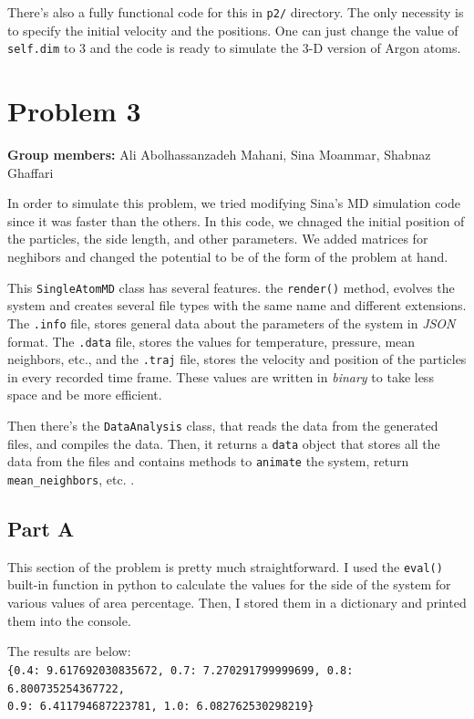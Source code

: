 \documentclass[12pt, a4paper]{article}
\begin{document}
	There's also a fully functional code for this in \texttt{p2/} directory. The only necessity is to specify the initial velocity and the positions. One can 
	just change the value of \texttt{self.dim} to $3$ and the code is ready to simulate the 3-D version of Argon atoms.

	\section{Problem 3}
	\textbf{Group members:} Ali Abolhassanzadeh Mahani, Sina Moammar, Shabnaz Ghaffari
	
	In order to simulate this problem, we tried modifying Sina's MD simulation code since it was faster than the others. In this code, we chnaged the 
	initial position of the particles, the side length, and other parameters. We added matrices for neghibors and changed the potential to be of 
	the form of the problem at hand. 
	
	This \texttt{SingleAtomMD} class has several features. the \texttt{render()} method, evolves the system and creates several file types with the
	same name and different extensions. The \texttt{.info} file, stores general data about the parameters of the system in \emph{JSON} format.
	The \texttt{.data} file, stores the values for temperature, pressure, mean neighbors, etc., and the \texttt{.traj} file, stores the velocity and
	position of the particles in every recorded time frame. These values are written in \emph{binary} to take less space and be more efficient.
	
	Then there's the \texttt{DataAnalysis} class, that reads the data from the generated files, and compiles the data. Then, it returns a \texttt{data}
	object that stores all the data from the files and contains methods to \texttt{animate} the system, return \texttt{mean\_neighbors}, etc. .
	
	\subsection{Part A}
	This section of the problem is pretty much straightforward. I used the \texttt{eval()} built-in function in python to calculate the values for 
	the side of the system for various values of area percentage. Then, I stored them in a dictionary and printed them into the console.
		
	The results are below:\\
	\texttt{\{0.4: 9.617692030835672, 0.7: 7.270291799999699, 0.8: 6.800735254367722,\\ 0.9: 6.411794687223781, 1.0: 6.082762530298219\}}
\end{document}
